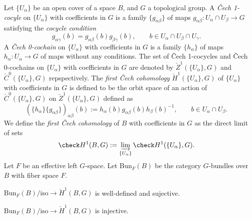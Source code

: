 \documentclass{../../large}
\begin{document}
\begin{prb}
Let $\{U_\alpha\}$ be an open cover of a space $B$, and $G$ a topological group.
A \emph{\v Cech 1-cocyle} on $\{U_\alpha\}$ with coefficients in $G$ is a family $\{g_{\alpha\beta}\}$ of maps $g_{\alpha\beta}:U_\alpha\cap U_\beta\to G$ satisfying the \emph{cocycle condition}
\[g_{\alpha\gamma}(b)=g_{\alpha\beta}(b)g_{\beta\gamma}(b),\qquad b\in U_\alpha\cap U_\beta\cap U_\gamma.\]
A \emph{\v Cech 0-cochain} on $\{U_\alpha\}$ with coefficients in $G$ is a family $\{h_\alpha\}$ of maps $h_\alpha:U_\alpha\to G$ of maps without any conditions.
The set of \v Cech 1-cocycles and \v Cech 0-cochains on $\{U_\alpha\}$ with coefficients in $G$ are denoted by $\check Z^1(\{U_\alpha\},G)$ and $\check C^0(\{U_\alpha\},G)$ repspectively.
The \emph{first \v Cech cohomology} $\check H^1(\{U_\alpha\},G)$ of $\{U_\alpha\}$ with coefficients in $G$ is defined to be the orbit space of an action of $\check C^0(\{U_\alpha\},G)$ on $\check Z^1(\{U_\alpha\},G)$ defined as
\[(\{h_\alpha\}\{g_{\alpha\beta}\})_{\alpha\beta}(b):=h_\alpha(b)g_{\alpha\beta}(b)h_\beta(b)^{-1},
\qquad b\in U_\alpha\cap U_\beta.\]
We define the \emph{first \v Cech cohomology} of $B$ with coefficients in $G$ as the direct limit of sets
\[\check H^1(B,G):=\varinjlim_{\{U_\alpha\}}\check H^1(\{U_\alpha\},G).\]
Let $F$ be an effective left $G$-space.
Let $\mathrm{Bun}_F(B)$ be the category $G$-bundles over $B$ with fiber space $F$.
\begin{parts}
\item $\mathrm{Bun}_F(B)/\text{iso}\to\check H^1(B,G)$ is well-defined and sujective.
\item $\mathrm{Bun}_F(B)/\text{iso}\to\check H^1(B,G)$ is injective.
\end{parts}
\end{prb}
\end{document}

